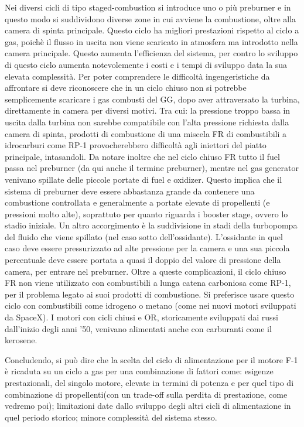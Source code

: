 Nei diversi cicli di tipo staged-combustion si introduce uno o più preburner e in questo modo si suddividono diverse zone in cui avviene la combustione, oltre alla camera di spinta principale. Questo ciclo ha migliori prestazioni rispetto al ciclo a gas, poichè il flusso in uscita non viene scaricato in atmosfera ma introdotto nella camera principale. Questo aumenta l'efficienza del sistema, per contro lo sviluppo di questo ciclo aumenta notevolemente i costi e i tempi di sviluppo data la sua elevata complessità. Per poter comprendere le difficoltà ingengeristiche da affrontare si deve riconoscere che in un ciclo chiuso non si potrebbe semplicemente scaricare i gas combusti del GG, dopo aver attraversato la turbina, direttamente in camera per diversi motivi. Tra cui: la pressione troppo bassa in uscita dalla turbina non sarebbe compatibile con l'alta pressione richiesta dalla camera di spinta, prodotti di combustione di una miscela FR di combustibili a idrocarburi come RP-1 provocherebbero difficoltà agli iniettori del piatto principale, intasandoli. Da notare inoltre che nel ciclo chiuso FR tutto il fuel passa nel preburner (da qui anche il termine preburner), mentre nel gas generator venivano spillate delle piccole portate di fuel e oxidizer. Questo implica che il sistema di preburner deve essere abbastanza grande da contenere una combustione controllata e generalmente a portate elevate di propellenti (e pressioni molto alte), soprattuto per quanto riguarda i booster stage, ovvero lo stadio iniziale. Un altro accorgimento è la suddivisione in stadi della turbopompa del fluido che viene spillato (nel caso sotto dell'ossidante). L'ossidante in quel caso deve essere pressurizzato ad alte pressione per la camera e una sua piccola percentuale deve essere portata a quasi il doppio del valore di pressione della camera, per entrare nel preburner. Oltre a queste complicazioni, il ciclo chiuso FR non viene utilizzato con combustibili a lunga catena carboniosa come RP-1, per il problema legato ai suoi prodotti di combustione. Si preferisce usare questo ciclo con combustibili come idrogeno o metano (come nei nuovi motori sviluppati da SpaceX). I motori con cicli chiusi e OR, storicamente sviluppati dai russi dall'inizio degli anni '50, venivano alimentati anche con carburanti come il kerosene. 

Concludendo, si può dire che la scelta del ciclo di alimentazione per il motore F-1 è ricaduta su un ciclo a gas per una combinazione di fattori come: esigenze prestazionali, del singolo motore, elevate in termini di potenza e per quel tipo di combinazione di propellenti(con un trade-off sulla perdita di prestazione, come vedremo poi); limitazioni date dallo sviluppo degli altri cicli di alimentazione in quel periodo storico; minore complessità del sistema stesso.

